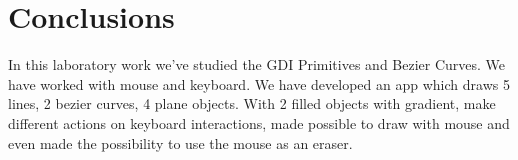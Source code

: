 \section*{Conclusions}

In this laboratory work we've studied the GDI Primitives and Bezier Curves. We have worked with mouse and keyboard. We have developed an app which draws 5 lines, 2 bezier curves, 4 plane objects. With 2 filled objects with gradient, make different actions on keyboard interactions, made possible to draw with mouse and even made the possibility to use the mouse as an eraser.

\clearpage